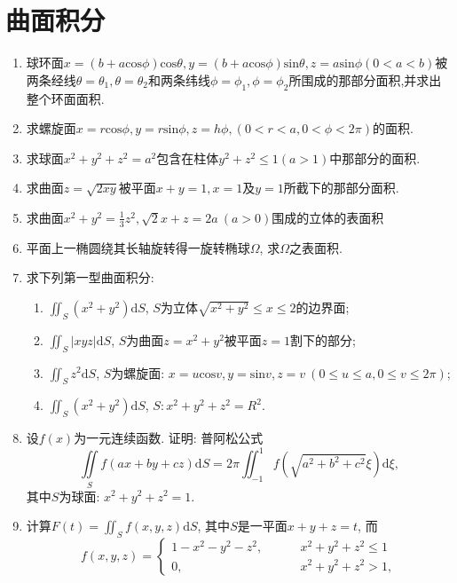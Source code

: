 \section{曲面积分}
\begin{enumerate}
	\item 球环面$x=(b+a\mathrm{cos}\phi)\mathrm{cos}\theta, y=(b+a\mathrm{cos}\phi)\mathrm{sin}\theta,z=a\mathrm{sin}\phi(0<a<b)$被两条经线$\theta=\theta_1,\theta=\theta_2$和两条纬线$\phi=\phi_1,\phi=\phi_2$所围成的那部分面积,并求出整个环面面积.
	\item 求螺旋面$x=r\mathrm{cos}\phi, y=r\mathrm{sin}\phi,z=h\phi,(0<r<a,0<\phi<2\pi)$的面积. 
	\item 求球面$x^2+y^2+z^2=a^2$包含在柱体$y^2+z^2\le 1(a>1)$中那部分的面积.
	\item 求曲面$z=\sqrt{2xy}$被平面$x+y=1,x=1$及$y=1$所截下的那部分面积.
	\item 求曲面$x^2+y^2=\frac{1}{3}z^2,\sqrt{2}x+z=2a\ (a>0)$围成的立体的表面积
	\item 平面上一椭圆绕其长轴旋转得一旋转椭球$\Omega$, 求$\Omega$之表面积.
	\item 求下列第一型曲面积分:
	\begin{enumerate}
		\item $\displaystyle{\iint_{S}(x^2+y^2)\mathrm{d}S}$, $S$为立体$\sqrt{x^2+y^2}\le x\le 2$的边界面;
		\item $\displaystyle{\iint_{S}|xyz|\mathrm{d}S}$, $S$为曲面$z=x^2+y^2$被平面$z=1$割下的部分;
		\item $\displaystyle{\iint_{S}z^2\mathrm{d}S}$, $S$为螺旋面: $x=u\mathrm{cos}v,y=\mathrm{sin}v,z=v\ (0\le u\le a, 0\le v\le 2\pi)$;
		\item $\displaystyle{\iint_{S}(x^2+y^2)\mathrm{d}S}$, $S:x^2+y^2+z^2=R^2$.
	\end{enumerate}
\item 设$f(x)$为一元连续函数. 证明: 普阿松公式$$ \displaystyle{\iint\limits_{S}f(ax+by+cz)\mathrm{d}S=2\pi\iint_{-1}^{1}f(\sqrt{a^2+b^2+c^2}\xi)\mathrm{d}\xi},$$
其中$S$为球面: $x^2+y^2+z^2=1$.
\item 计算$F(t)=\displaystyle{\iint_{S}f(x,y,z)\mathrm{d}S}$, 其中$S$是一平面$x+y+z=t$, 而$$
f(x,y,z)=\begin{cases}
1-x^2-y^2-z^2,\ &\qquad x^2+y^2+z^2\le 1\\
0,\ &\qquad x^2+y^2+z^2>1,
\end{cases}$$


\end{enumerate}
